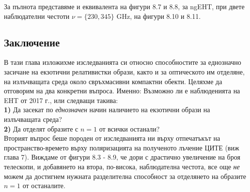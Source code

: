 За пълнота представяме и еквивалента на фигури 8.7 и 8.8, за ngEHT, при двете наблюдателни честоти $\nu = \{230, 345\}$ GHz, на фигури 8.10 и 8.11.

\subsection{Заключение}

В тази глава изложихме изследванията си относно способностите за еднозначно засичане на екзотични релативистки образи, както и за оптическото им отделяне, на излъчващата среда около свръхмасивни компактни обекти. Целяхме да отговорим на два конкретни въпроса. Именно: Възможно ли е наблюденията на EHT от 2017 г., или следващи такива:\\

\textbf{1)} Да засекат по \emph{еднозначен} начин наличието на екзотични образи на излъчващата среда?\\

\textbf{2)} Да отделят образите с $n = 1$ от всички останали?\\

Вторият въпрос беше породен от изследванията ни върху отпечатъкът на пространство-времето върху поляризацията на полученото лъчение ЦИТЕ (виж глава 7). Виждаме от фигури 8.3 - 8.9, че дори с драстично увеличение на броя телескопи, и добавянето на втора, по-висока, наблюдателна честота, все още \emph{не} можем да достигнем нужната разделителна способност за отделянето на образите $n = 1$ от останалите. \\

